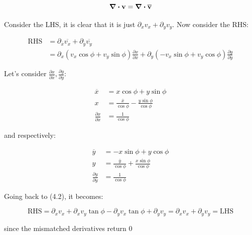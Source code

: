 \documentclass{article}
\numberwithin{equation}{section}
\begin{document}
\begin{equation}
    \vb{\div v = \div \overline{v}}
\end{equation}

Consider the LHS, it is clear that it is just $\partial_x v_x + \partial_y v_y$. Now consider the RHS:

\begin{equation}
\begin{split}
    \text{RHS} &= \partial_{\overline{x}} \overline{v_x} + \partial_{\overline{y}}  \overline{v_y} \\
    &= \partial_x (v_x \cos \phi + v_y\sin \phi) \frac{\partial x}{\partial \overline{x}} + \partial_y  (-v_x\sin \phi + v_y\cos \phi) \frac{\partial y}{\partial \overline{y}}
\end{split}
\end{equation}

Let's consider $\frac{\partial x}{\partial \overline{x}}, \frac{\partial y}{\partial \overline{y}}$:

\begin{equation}
\begin{split}
\overline{x} &= x \cos \phi + y \sin \phi \\
x &= \frac{\overline{x}}{\cos \phi} - \frac{y \sin \phi}{\cos \phi} \\
    \frac{\partial x}{\partial \overline{x}} &=  \frac{1}{\cos \phi}
    \end{split}
\end{equation}

and respectively:

\begin{equation}
\begin{split}
    \overline{y} &= -x \sin \phi + y \cos \phi \\
    y &= \frac{\overline{y}}{\cos \phi} + \frac{x \sin \phi}{\cos \phi}\\
    \frac{\partial y}{\partial \overline{y}} &= \frac{1}{\cos \phi}
    \end{split}
\end{equation}

Going back to (4.2), it becomes:

\begin{equation}
    \text{RHS} = \partial_x v_x + \partial_x v_y \tan \phi - \partial_y v_x \tan \phi + \partial_y v_y = \partial_x v_x + \partial_y v_y = \text{LHS}
\end{equation}

since the mismatched derivatives return $0$
\end{document}
